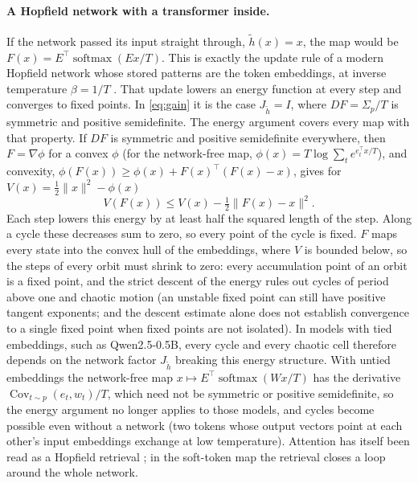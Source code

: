\documentclass[11pt,letterpaper]{article}
\begin{document}
\paragraph{A Hopfield network with a transformer inside.} If the network passed its input straight through,
$\tilde h(x)=x$, the map would be $F(x)=E^{\top}\operatorname{softmax}(Ex/T)$. This is exactly the update rule of a
modern Hopfield network whose stored patterns are the token embeddings, at inverse temperature $\beta=1/T$
\cite{ramsauer2020hopfield}. That update lowers an energy function at every step and converges to fixed points.
In \eqref{eq:gain} it is the case $J_{\tilde h}=I$, where $DF=\Sigma_p/T$ is symmetric and positive semidefinite.
The energy argument covers every map with that property. If $DF$ is symmetric and positive semidefinite everywhere,
then $F=\nabla\phi$ for a convex $\phi$ (for the network-free map, $\phi(x)=T\log\sum_t e^{e_t^{\top}x/T}$), and
convexity, $\phi(F(x))\ge\phi(x)+F(x)^{\top}(F(x)-x)$, gives for $V(x)=\tfrac12\|x\|^2-\phi(x)$
\begin{equation}
V(F(x))\le V(x)-\tfrac12\|F(x)-x\|^2 .
\end{equation}
Each step lowers this energy by at least half the squared length of the step. Along a cycle these decreases sum to
zero, so every point of the cycle is fixed. $F$ maps every state into the convex hull of the embeddings, where $V$ is
bounded below, so the steps of every orbit must shrink to zero: every accumulation point of an orbit is a fixed point,
and the strict descent of the energy rules out cycles of period above one and chaotic motion (an unstable fixed point can still have positive tangent
exponents; and the descent estimate alone does not establish convergence to a single fixed point when fixed points are not
isolated). In models with tied
embeddings, such as Qwen2.5-0.5B, every cycle and every chaotic cell
therefore depends on the network factor $J_{\tilde h}$ breaking this energy structure. With untied embeddings the
network-free map $x\mapsto E^{\top}\operatorname{softmax}(Wx/T)$ has the derivative
$\operatorname{Cov}_{t\sim p}(e_t,w_t)/T$, which need not be symmetric or positive semidefinite, so the energy argument
no longer applies to those models, and cycles become possible even without a network (two tokens whose output
vectors point at each other's input embeddings exchange at low temperature). Attention has itself been read as a Hopfield retrieval \cite{ramsauer2020hopfield}; in the soft-token
map the retrieval closes a loop around the whole network.
\end{document}
